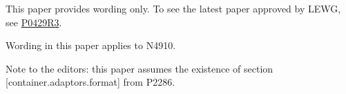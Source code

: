 
% 

This paper provides wording only.  To see the latest paper approved by LEWG,
see \href{http://www.open-std.org/jtc1/sc22/wg21/docs/papers/2017/p0429r3.pdf}{P0429R3}.

Wording in this paper applies to N4910.

Note to the editors: this paper assumes the existence of section
[container.adaptors.format] from P2286.

\markboth{\contentsname}{}

\makeatletter
\renewcommand\@pnumwidth{2.5em}
\makeatother

\tableofcontents
\setcounter{tocdepth}{5}

%
